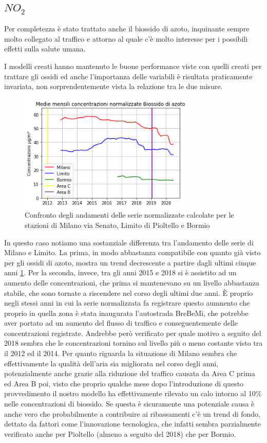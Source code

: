 \documentclass[a4paper]{report}
\begin{document}
\subsection{$NO_2$}
Per completezza è stato trattato anche il biossido di azoto, inquinante sempre molto collegato al traffico e attorno al quale c'è molto interesse per i possibili effetti sulla salute umana.

I modelli creati hanno mantenuto le buone performance viste con quelli creati per trattare gli ossidi ed anche l'importanza delle variabili è risultata praticamente invariata, non sorprendentemente vista la relazione tra le due misure.

\begin{figure}[h]
\centering
\includegraphics[width=0.75\textwidth]{no2_traffico}
\caption{Confronto degli andamenti delle serie normalizzate calcolate per le stazioni di Milano via Senato, Limito di Pioltello e Bormio}
\label{fig:no2_traffico}
\end{figure}

In questo caso notiamo una sostanziale differenza tra l'andamento delle serie di Milano e Limito. La prima, in modo abbastanza compatibile con quanto già visto per gli ossidi di azoto, mostra un trend decrescente a partire dagli ultimi cinque anni \ref{fig:no2_traffico}. Per la seconda, invece, tra gli anni 2015 e 2018 si è assistito ad un aumento delle concentrazioni, che prima si mantenevano su un livello abbastanza stabile, che sono tornate a riscendere nel corso degli ultimi due anni. È proprio negli stessi anni in cui la serie normalizzata fa registrare questo aumnento che proprio in quella zona è stata inaugurata l'autostrada BreBeMi, che potrebbe aver portato ad un aumento del flusso di traffico e conseguentemente delle concentrazioni registrate. Andrebbe però verificato per quale motivo a seguito del 2018 sembra che le concentrazioni tornino sul livello più o meno costante visto tra il 2012 ed il 2014.
Per quanto riguarda la situazione di Milano sembra che effettivamente la qualità dell'aria sia migliorata nel corso degli anni, potenzialmente anche grazie alla riduzione del traffico causata da Area C prima ed Area B poi, visto che proprio qualche mese dopo l'introduzione di questo provvedimento il nostro modello ha effettivamente rilevato un calo intorno al 10\% nelle concentrazioni di biossido. Se questa è sicuramente una potenziale causa è anche vero che probabilmente a contribuire ai ribassamenti c'è un trend di fondo, dettato da fattori come l'innovazione tecnologica, che infatti sembra parzialmente verificato anche per Pioltello (almeno a seguito del 2018) che per Bormio.
\end{document}
